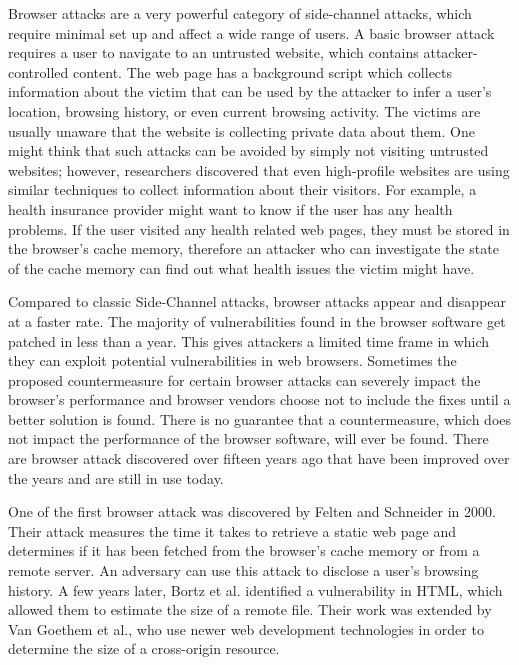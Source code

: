 \documentclass[a4paper,11pt]{article}
\begin{document}
Browser attacks are a very powerful category of side-channel attacks, which require minimal set up and affect a wide range of users. A basic browser attack requires a user to navigate to an untrusted website, which contains attacker-controlled content. The web page has a background script which collects information about the victim that can be used by the attacker to infer a user's location, browsing history, or even current browsing activity. The victims are usually unaware that the website is collecting private data about them. One might think that such attacks can be avoided by simply not visiting untrusted websites; however, researchers discovered that even high-profile websites are using similar techniques to collect information about their visitors\cite{jang2010empirical}. For example, a health insurance provider might want to know if the user has any health problems. If the user visited any health related web pages, they must be stored in the browser's cache memory, therefore an attacker who can investigate the state of the cache memory can find out what health issues the victim might have.

Compared to classic Side-Channel attacks, browser attacks appear and disappear at a faster rate. The majority of vulnerabilities found in the browser software get patched in less than a year. This gives attackers a limited time frame in which they can exploit potential vulnerabilities in web browsers. Sometimes the proposed countermeasure for certain browser attacks can severely impact the browser's performance and browser vendors choose not to include the fixes until a better solution is found. There is no guarantee that a countermeasure, which does not impact the performance of the browser software, will ever be found. There are browser attack discovered over fifteen years ago that have been improved over the years and are still in use today.

One of the first browser attack was discovered by Felten and Schneider\cite{felten2000timing} in 2000. Their attack measures the time it takes to retrieve a static web page and determines if it has been fetched from the browser's cache memory or from a remote server. An adversary can use this attack to disclose a user's browsing history. A few years later, Bortz et al.\cite{bortz2007exposing} identified a vulnerability in HTML, which allowed them to estimate the size of a remote file. Their work was extended by Van Goethem et al.\cite{van2015clock}, who use newer web development technologies in order to determine the size of a cross-origin resource.
 
\end{document}
